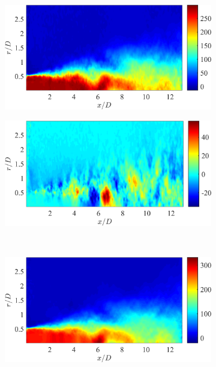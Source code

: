 \begin{figure}
	\centering
	\begin{subfigure}{0.5\textwidth}
		\centering
		\includegraphics[width=0.95\linewidth]{Figures/ch5_valid_Inst_Uz.png}
		\caption{}
	\end{subfigure}%
	\begin{subfigure}{0.5\textwidth}
		\centering
		\includegraphics[width=0.95\linewidth]{Figures/ch5_valid_Inst_Ur.png}
		\caption{}
	\end{subfigure}\\
	\begin{subfigure}{0.5\textwidth}
		\centering
		\includegraphics[width=0.95\linewidth]{Figures/ch5_valid_Inst_solUz.png}

\end{subfigure}
\end{figure}

